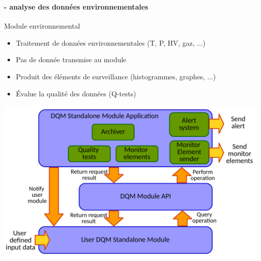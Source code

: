 \documentclass[8pt]{beamer}
\begin{document}
\begin{frame}
\begin{minipage}{0.18\textwidth}
\begin{flushright}
        \end{flushright}
      \end{minipage}
    \end{frame}

    \begin{frame}
    \frametitle{\secname}
    \framesubtitle{\subsecname - analyse des données environnementales}
      \begin{minipage}{0.78\textwidth}
        \begin{block}{Module environnemental}
          \begin{itemize}
            \item Traitement de données environnementales (T, P, HV, gaz, ...)
            \item Pas de donnée transmise au module
            \item Produit des éléments de surveillance (histogrammes, graphes, ...)
            \item Évalue la qualité des données (Q-tests)
          \end{itemize}
        \end{block}
        \begin{center}
          \includegraphics[width=\linewidth]{StandaloneModuleApplicationDiagram.pdf}

\end{center}
\end{minipage}
\end{frame}
\end{document}

